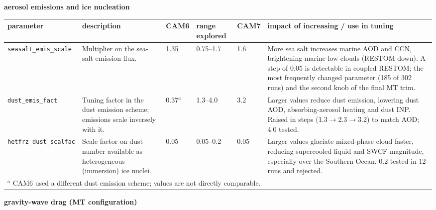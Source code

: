 \documentclass[draft]{agujournal2019}
\begin{document}
\newpage
\noindent\textbf{aerosol emissions and ice nucleation}
\medskip

\scriptsize
 \begin{tabular}{p{2.3cm} p{3.1cm} p{0.9cm} p{1.8cm} p{1.0cm} p{4.2cm}}
  \hline
 parameter & description & CAM6 & range explored & CAM7 & impact of increasing / use in tuning \\
 \hline  \hline
\texttt{seasalt\_\allowbreak emis\_\allowbreak scale} &
Multiplier on the sea-salt emission flux. &
1.35 & 0.75--1.7 & 1.6 &
More sea salt increases marine AOD and CCN, brightening marine low clouds
(RESTOM down). A step of 0.05 is detectable in coupled RESTOM; the most
frequently changed parameter (185 of 302 runs) and the second knob of the
final MT trim. \\

\texttt{dust\_\allowbreak emis\_\allowbreak fact} &
Tuning factor in the dust emission scheme; emissions scale inversely with it. &
0.37$^{a}$ & 1.3--4.0 & 3.2 &
Larger values reduce dust emission, lowering dust AOD, absorbing-aerosol
heating and dust INP. Raised in steps (1.3$\rightarrow$2.3$\rightarrow$3.2)
to match AOD; 4.0 tested. \\

\texttt{hetfrz\_\allowbreak dust\_\allowbreak scalfac} &
Scale factor on dust number available as heterogeneous (immersion) ice
nuclei. &
0.05 & 0.05--0.2 & 0.05 &
Larger values glaciate mixed-phase cloud faster, reducing supercooled liquid
and SWCF magnitude, especially over the Southern Ocean. 0.2 tested in 12 runs
and rejected. \\
 \hline
 \hline
 \multicolumn{6}{l}{\footnotesize $^{a}$ CAM6 used a different dust emission scheme; values are not directly comparable.}\\
 \end{tabular}
\normalsize


\newpage
\noindent\textbf{gravity-wave drag (MT configuration)}
\medskip
\end{document}
